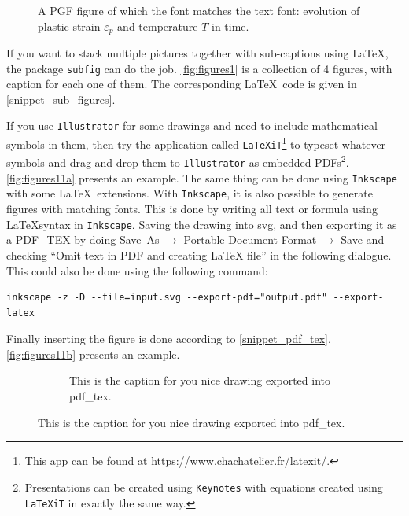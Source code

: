 \documentclass[authoryear,3p,times,preprint,review,fleqn]{elsarticle}
\numberwithin{equation}{section}
\theoremstyle{remark}
\begin{document}
\begin{figure}[!h]
  \centering
  
  \caption{A PGF figure of which the font matches the text font: 
  evolution of plastic strain $\varepsilon_p$ and temperature  $T$ in time.}
  \label{fig:cold-spray-plot-pgf}
\end{figure}



If you want to stack multiple pictures together with sub-captions using \LaTeX, the package \texttt{subfig} can do the job. \cref{fig:figures1} is a collection of 4 figures, with caption for each one of them. The corresponding \LaTeX\ code is given in \cref{snippet_sub_figures}.

If you use \texttt{Illustrator} for some drawings and need to include mathematical symbols in them, then try the application called \texttt{LaTeXiT}\footnote{This app can be found at \url{https://www.chachatelier.fr/latexit/}.} to typeset whatever symbols and drag and drop them to \texttt{Illustrator} as embedded PDFs\footnote{Presentations can be created using \texttt{Keynotes} with equations created using \texttt{LaTeXiT} in exactly the same way.}.  \cref{fig:figures11a} presents an example. The same thing can be done using \texttt{Inkscape} with some \LaTeX\ extensions. With \texttt{Inkscape}, it is also possible to generate figures with matching fonts. This is done by writing all text or formula using \LaTeX syntax in \texttt{Inkscape}. Saving the drawing into svg, and then exporting it as a PDF\_TEX by doing Save~As $\rightarrow$ Portable Document Format $\rightarrow$  Save and checking ``Omit text in PDF and creating LaTeX file'' in the following dialogue. This could also be done using the following command:
\begin{verbatim}
inkscape -z -D --file=input.svg --export-pdf="output.pdf" --export-latex
\end{verbatim}
Finally inserting the figure is done according to \cref{snippet_pdf_tex}. \cref{fig:figures11b} presents an example.


\begin{figure}[!h]
  \begin{snippetlatex}[caption={\LaTeX\ commands to insert a PDF image with embedded \LaTeX\ text (matching font)},label={snippet_pdf_tex},framerule=1pt,tabsize=3]
    \begin{figure}
      \centering
      
      \caption{This is the caption for you nice drawing exported into pdf_tex.}
      \label{fig:pdf_tex}
    \end{figure}
  \end{snippetlatex}
\end{figure}
\end{document}
